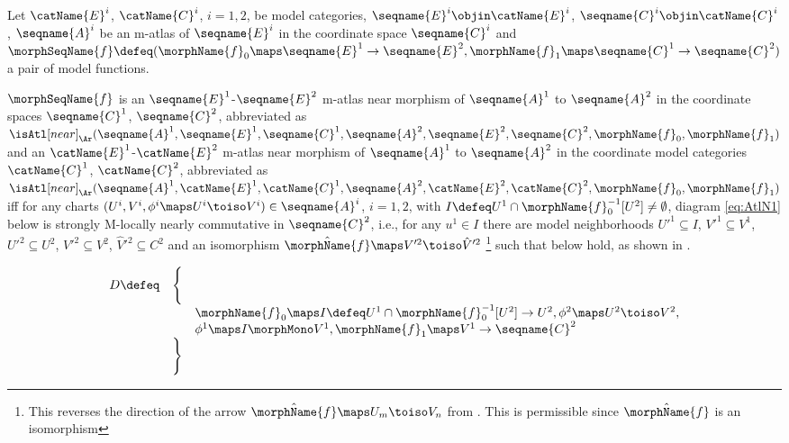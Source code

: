 \documentclass{article}
\begin{document}
\begin{definition}
\label{def:M-ATLmorphnear}
Let $\catName{E}^i$, $\catName{C}^i$, $i=1,2$, be model categories,
$\seqname{E}^i \objin \catName{E}^i$,
$\seqname{C}^i \objin \catName{C}^i$, $\seqname{A}^i$ be an m-atlas of
$\seqname{E}^i$ in the coordinate space $\seqname{C}^i$ and
$
  \morphSeqName{f} \defeq
  (
    \morphName{f}_0 \maps \seqname{E}^1 \to \seqname{E}^2,
    \morphName{f}_1 \maps \seqname{C}^1 \to \seqname{C}^2
  )
$
a pair of model functions.

$\morphSeqName{f}$ is an $\seqname{E}^1$-$\seqname{E}^2$ m-atlas near
morphism of $\seqname{A}^1$ to $\seqname{A}^2$ in the coordinate spaces
$\seqname{C}^1$, $\seqname{C}^2$, abbreviated as
$
  \isAtl[near]_\Ar
    (
      \seqname{A}^1,
      \seqname{E}^1,
      \seqname{C}^1,
      \seqname{A}^2,
      \seqname{E}^2,
      \seqname{C}^2,
      \morphName{f}_0,
      \morphName{f}_1
    )
$
and an $\catName{E}^1$-$\catName{E}^2$ m-atlas near morphism of
$\seqname{A}^1$ to $\seqname{A}^2$ in the coordinate model categories
$\catName{C}^1$, $\catName{C}^2$, abbreviated as
$
  \isAtl[near]_\Ar
  (
    \seqname{A}^1,
    \catName{E}^1,
    \catName{C}^1,
    \seqname{A}^2,
    \catName{E}^2,
    \catName{C}^2,
    \morphName{f}_0,
    \morphName{f}_1
  )
$
iff for any charts
$(U^i, V^i, \phi^i \maps U^i \toiso V^i) \in \seqname{A}^i$, $i=1,2$,
with $I \defeq U^1 \cap \morphName{f}^{-1}_0[U^2] \neq \emptyset$,
diagram \eqref{eq:AtlN1} below is strongly M-locally nearly commutative
in $\seqname{C}^2$, i.e., for any
$u^1 \in I$ there are model neighborhoods $U'^1 \subseteq I$,
$V'^1 \subseteq V^1$, $U'^2 \subseteq U^2$, $V'^2 \subseteq V^2$,
$\hat{V}'^2 \subseteq C^2$ and an isomorphism
$\hat{\morphName{f}} \maps V'^2 \toiso \hat{V}'^2$%
\footnote
{
  This reverses the direction of the arrow
  $\hat{\morphName{f}} \maps U_m \toiso V_n$ from
  .
  This is permissible since $\hat{\morphName{f}}$ is an isomorphism
}
\setcounter{fn:reverses} {\value{footnote}}
such that  below hold, as shown in
{
  \showlabelsinline
  .
}

\begin{equation}
\label{eq:AtlN1}
\begin{array} {lll}
D \defeq & \Biggl \{
\\
  &&
  \morphName{f}_0 \maps I \defeq U^1 \cap \morphName{f}^{-1}_0[U^2] \to U^2,
  \phi^2 \maps U^2 \toiso V^2,
\\
  &&
  \phi^1 \maps I \morphMono V^1,
  \morphName{f}_1 \maps  V^1 \to \seqname{C}^2
\\
& \Biggr \}
\end{array}
\end{equation}


\end{definition}
\end{document}
